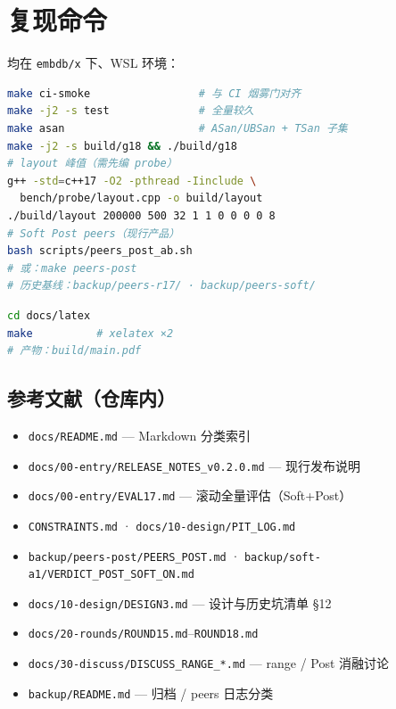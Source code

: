 \section{复现命令}
\label{app:repro}

均在 \texttt{embdb/x} 下、WSL 环境：

\begin{lstlisting}[language=bash,caption={回归与关键探针}]
make ci-smoke                 # 与 CI 烟雾门对齐
make -j2 -s test              # 全量较久
make asan                     # ASan/UBSan + TSan 子集
make -j2 -s build/g18 && ./build/g18
# layout 峰值（需先编 probe）
g++ -std=c++17 -O2 -pthread -Iinclude \
  bench/probe/layout.cpp -o build/layout
./build/layout 200000 500 32 1 1 0 0 0 0 8
# Soft Post peers（现行产品）
bash scripts/peers_post_ab.sh
# 或：make peers-post
# 历史基线：backup/peers-r17/ · backup/peers-soft/
\end{lstlisting}

\begin{lstlisting}[language=bash,caption={本文档编译}]
cd docs/latex
make          # xelatex ×2
# 产物：build/main.pdf
\end{lstlisting}

\subsection*{参考文献（仓库内）}
\begin{itemize}[leftmargin=1.6em]
  \item \texttt{docs/README.md} — Markdown 分类索引
  \item \texttt{docs/00-entry/RELEASE\_NOTES\_v0.2.0.md} — 现行发布说明
  \item \texttt{docs/00-entry/EVAL17.md} — 滚动全量评估（Soft+Post）
  \item \texttt{CONSTRAINTS.md} · \texttt{docs/10-design/PIT\_LOG.md}
  \item \texttt{backup/peers-post/PEERS\_POST.md} · \texttt{backup/soft-a1/VERDICT\_POST\_SOFT\_ON.md}
  \item \texttt{docs/10-design/DESIGN3.md} — 设计与历史坑清单 §12
  \item \texttt{docs/20-rounds/ROUND15.md}--\texttt{ROUND18.md}
  \item \texttt{docs/30-discuss/DISCUSS\_RANGE\_*.md} — range / Post 消融讨论
  \item \texttt{backup/README.md} — 归档 / peers 日志分类
\end{itemize}

